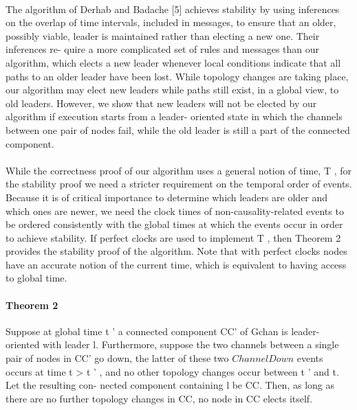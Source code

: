 \paragraph{}The algorithm of Derhab and Badache [5] achieves stability by using inferences on the overlap of time intervals, included in messages, to ensure that an older, possibly viable, leader is maintained rather than electing a new one. Their inferences re- quire a more complicated set of rules and messages than our algorithm, which elects a new leader whenever local conditions indicate that all paths to an older leader have been lost. While topology changes are taking place, our algorithm may elect new leaders while paths still exist, in a global view, to old leaders. However, we show that new leaders will not be elected by our algorithm if execution starts from a leader- oriented state in which the channels between one pair of nodes fail, while the old leader is still a part of the connected component.
\paragraph{}While the correctness proof of our algorithm uses a general notion of time, T , for the stability proof we need a stricter requirement on the temporal order of events. Because it is of critical importance to determine which leaders are older and which ones are newer, we need the clock times of non-causality-related events to be ordered consistently with the global times at which the events occur in order to achieve stability. If perfect clocks are used to implement T , then Theorem 2 provides the stability proof of the algorithm. Note that with perfect clocks nodes have an accurate notion of the current time, which is equivalent to having access to global time.
\paragraph{Theorem 2}Suppose at global time t ' a connected component CC' of Gchan is leader- oriented with leader l. Furthermore, suppose the two channels between a single pair of nodes in CC' go down, the latter of these two $ChannelDown$ events occurs at time t > t ' , and no other topology changes occur between t ' and t. Let the resulting con- nected component containing l be CC. Then, as long as there are no further topology changes in CC, no node in CC elects itself.
